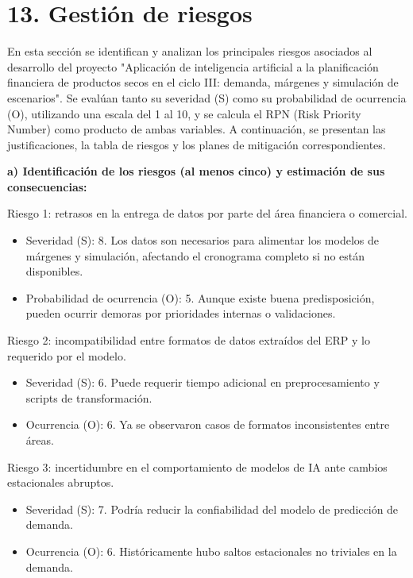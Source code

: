 \documentclass[
11pt, %
]{charter}
\begin{document}
\section{13. Gestión de riesgos}
\label{sec:riesgos}

En esta sección se identifican y analizan los principales riesgos asociados al desarrollo del proyecto "Aplicación de inteligencia artificial a la planificación financiera de productos secos en el ciclo III: demanda, márgenes y simulación de escenarios". Se evalúan tanto su severidad (S) como su probabilidad de ocurrencia (O), utilizando una escala del 1 al 10, y se calcula el RPN (Risk Priority Number) como producto de ambas variables. A continuación, se presentan las justificaciones, la tabla de riesgos y los planes de mitigación correspondientes.

\textbf{a) Identificación de los riesgos (al menos cinco) y estimación de sus consecuencias:}


Riesgo 1: retrasos en la entrega de datos por parte del área financiera o comercial.
\begin{itemize}
	\item Severidad (S): 8. Los datos son necesarios para alimentar los modelos de márgenes y simulación, afectando el cronograma completo si no están disponibles.
	\item Probabilidad de ocurrencia (O): 5. Aunque existe buena predisposición, pueden ocurrir demoras por prioridades internas o validaciones.\\
\end{itemize}   

Riesgo 2: incompatibilidad entre formatos de datos extraídos del ERP y lo requerido por el modelo.
\begin{itemize}
	\item Severidad (S): 6. Puede requerir tiempo adicional en preprocesamiento y scripts de transformación.
	\item Ocurrencia (O): 6. Ya se observaron casos de formatos inconsistentes entre áreas.
\end{itemize}

Riesgo 3: incertidumbre en el comportamiento de modelos de IA ante cambios estacionales abruptos.
\begin{itemize}
	\item Severidad (S):  7. Podría reducir la confiabilidad del modelo de predicción de demanda.
	\item Ocurrencia (O): 6. Históricamente hubo saltos estacionales no triviales en la demanda.
\end{itemize}
\end{document}
